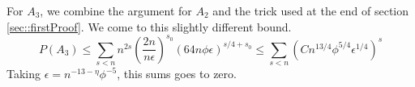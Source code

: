  For $A_3$, we combine the argument for $A_2$ and the trick used at the end of section \ref{sec::firstProof}. We come to this slightly different bound.
 \begin{equation*}
P(A_3) \leq  \sum_{s < n}n^{2s}(\dfrac{2n}{n\epsilon})^{s_0}(64n\phi\epsilon)^{s/4 + s_0} \leq \sum_{s < n}(Cn^{13/4}\phi^{5/4}\epsilon^{1/4})^{s}
\end{equation*}
 Taking $\epsilon = n^{-13-\eta}\phi^{-5}$, this sums goes to zero.
